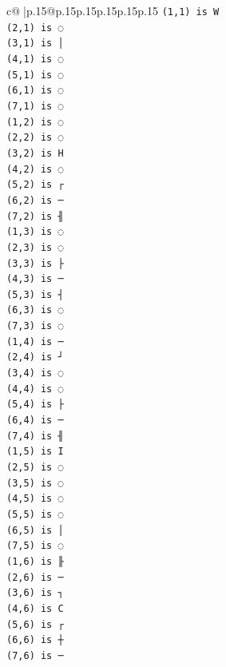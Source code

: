 \documentclass{article}
\begin{document}
{\begin{supertabular}{c@{$\;$}|p{.15\linewidth}@{}p{.15\linewidth}p{.15\linewidth}p{.15\linewidth}p{.15\linewidth}p{.15\linewidth}}
{{{\texttt{(1,1) is W} \\
\texttt{(2,1) is ◌} \\
\texttt{(3,1) is │} \\
\texttt{(4,1) is ◌} \\
\texttt{(5,1) is ◌} \\
\texttt{(6,1) is ◌} \\
\texttt{(7,1) is ◌} \\
\texttt{(1,2) is ◌} \\
\texttt{(2,2) is ◌} \\
\texttt{(3,2) is H} \\
\texttt{(4,2) is ◌} \\
\texttt{(5,2) is ┌} \\
\texttt{(6,2) is ─} \\
\texttt{(7,2) is ╢} \\
\texttt{(1,3) is ◌} \\
\texttt{(2,3) is ◌} \\
\texttt{(3,3) is ├} \\
\texttt{(4,3) is ─} \\
\texttt{(5,3) is ┤} \\
\texttt{(6,3) is ◌} \\
\texttt{(7,3) is ◌} \\
\texttt{(1,4) is ─} \\
\texttt{(2,4) is ┘} \\
\texttt{(3,4) is ◌} \\
\texttt{(4,4) is ◌} \\
\texttt{(5,4) is ├} \\
\texttt{(6,4) is ─} \\
\texttt{(7,4) is ╢} \\
\texttt{(1,5) is I} \\
\texttt{(2,5) is ◌} \\
\texttt{(3,5) is ◌} \\
\texttt{(4,5) is ◌} \\
\texttt{(5,5) is ◌} \\
\texttt{(6,5) is │} \\
\texttt{(7,5) is ◌} \\
\texttt{(1,6) is ╟} \\
\texttt{(2,6) is ─} \\
\texttt{(3,6) is ┐} \\
\texttt{(4,6) is C} \\
\texttt{(5,6) is ┌} \\
\texttt{(6,6) is ┼} \\
\texttt{(7,6) is ─} \\
}}}
\end{supertabular}}
\end{document}
